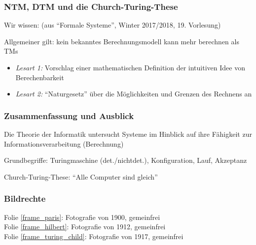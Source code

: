 \documentclass[aspectratio=1610,onlymath]{beamer}
\begin{document}
\begin{frame}\frametitle{NTM, DTM und die Church-Turing-These}

Wir wissen: {\tiny(aus "`Formale Systeme"', Winter 2017/2018, 19. Vorlesung)}

\pause

Allgemeiner gilt: kein bekanntes Berechnungsmodell kann mehr berechnen als TMs


\begin{itemize}
\item \emph{Lesart 1:} Vorschlag einer mathematischen Definition der intuitiven Idee von Berechenbarkeit
\item \emph{Lesart 2:} "`Naturgesetz"' über die Möglichkeiten und Grenzen des Rechnens an 
\end{itemize}

\end{frame}

\begin{frame}\frametitle{Zusammenfassung und Ausblick}

Die Theorie der Informatik untersucht Systeme im Hinblick auf ihre Fähigkeit zur Informationsverarbeitung (Berechnung)
\bigskip

Grundbegriffe: Turingmaschine (det./nichtdet.), Konfiguration, Lauf, Akzeptanz
\bigskip

Church-Turing-These: "`Alle Computer sind gleich"'
\bigskip


\end{frame}

\begin{frame}[t]\frametitle{Bildrechte}

Folie \ref{frame_paris}: Fotografie von 1900, gemeinfrei\\
Folie \ref{frame_hilbert}: Fotografie von 1912, gemeinfrei\\
Folie \ref{frame_turing_child}: Fotografie von 1917, gemeinfrei\\

\end{frame}
\end{document}
